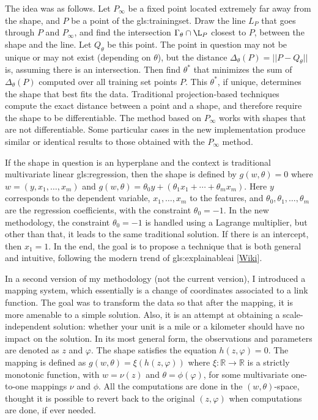 \documentclass[oneside,10pt]{book}
\begin{document}
The idea was as follows. Let $P_\infty$ be a fixed point located extremely far away from the shape, and $P$ be a point of the \gls{gls:trainingset}. Draw the line
 $L_P$ that goes through $P$ and $P_\infty$, and find the intersection $\Gamma_\theta \cap \L_P$ closest to $P$, between the shape and the line. Let $Q_\theta$ be this point. The point in question may not be unique or may not exist (depending on $\theta$), but the distance $\Delta_\theta(P)=||P-Q_\theta||$ is, assuming there is an intersection. Then find $\theta^*$ that
minimizes the sum of $\Delta_\theta(P)$ computed over all training set points $P$. This $\theta^*$, if unique, determines the shape that best fits the data. Traditional projection-based techniques compute the exact distance between a point and a shape, and therefore require the shape to be differentiable. The method based on
 $P_\infty$ works with shapes that are not differentiable. Some particular cases in the new implementation produce similar or identical results to those obtained with the $P_\infty$ method.

If the shape in question is an hyperplane and the context is traditional multivariate linear \gls{gls:regression}, then the shape is defined by
$g(w,\theta)=0$ where $w=(y,x_1,\dots,x_m)$ and $g(w,\theta)=\theta_0 y+(\theta_1 x_1+\cdots +\theta_m x_m)$. Here $y$ corresponds to the dependent variable, $x_1,\dots, x_m$ to the features, and $\theta_0, \theta_1,\dots,\theta_m$ are the regression coefficients, with the constraint
$\theta_0=-1$. In the new methodology, the constraint $\theta_0=-1$ is handled using a Lagrange multiplier, but other than that, it leads to the same traditional solution. If there is an intercept, then $x_1=1$. In the end, the goal is to propose a technique that is both general and intuitive,
 following the modern trend of \gls{gls:explainableai} [\href{https://en.wikipedia.org/wiki/Explainable_artificial_intelligence}{Wiki}].

In a second version of my methodology (not the current version), I introduced a mapping system, which essentially is a change of coordinates
 associated to a link function. The
 goal was to transform the data so that after the mapping, it is more amenable to a simple solution. Also, it is an attempt at
 obtaining a scale-independent solution: whether your unit is a mile or a kilometer should have no impact on the solution. In its most general form, the observations and parameters are denoted as $z$ and $\varphi$. The shape satisfies the equation $h(z,\varphi)=0$. The mapping is defined as
$g(w,\theta)=\xi(h(z,\varphi))$ where $\xi : \mathbb{R} \rightarrow \mathbb{R}$ is a strictly monotonic function, with $w=\nu(z)$ and $\theta
 = \phi(\varphi)$, for some multivariate one-to-one mappings $\nu$ and $\phi$. All the computations are done in the $(w,\theta)$-space, thought it is possible to revert back to the original $(z,\varphi)$ when computations are done, if ever needed.
\end{document}
